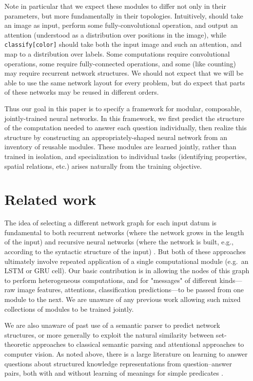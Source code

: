 \documentclass[10pt,twocolumn,letterpaper]{article}
\begin{document}
Note in particular that we expect these modules to differ not only in their
parameters, but more fundamentally in their topologies. Intuitively, 
should take an image as input, perform some fully-convolutional operation, and
output an attention (understood as a distribution over positions in the image),
while {\small\tt classify[color]} should take both the input image and such an attention, and map to a
distribution over labels. Some computations require convolutional operations, some require fully-connected operations, and some (like counting) may require recurrent network structures. We should not expect that we will be able to use the same network layout for every problem, but do expect that parts of these networks may be reused in different orders.

Thus our goal in this paper is to specify a framework for modular, composable, jointly-trained neural networks. In this framework, we first predict the structure of the computation needed to answer each question individually, then realize this structure by constructing an appropriately-shaped neural network from an inventory of reusable modules. These modules are learned jointly, rather than trained in isolation, and specialization to individual tasks (identifying properties, spatial relations, etc.) arises naturally from the training objective.

\section{Related work}

The idea of selecting a different network graph for each input datum is fundamental to both recurrent networks (where the network grows in the length of the input) \cite{Elman90RNN} and recursive neural networks (where the network is built, e.g., according to the syntactic structure of the input) \cite{Socher13CVG}. But both of these approaches ultimately involve repeated application of a single computational module (e.g.\ an LSTM or GRU cell). Our basic contribution is in allowing the nodes of this graph to perform heterogeneous computations, and for "messages" of different kinds---raw image features, attentions, classification predictions---to be passed from one module to the next. We are unaware of any previous work allowing such mixed collections of modules to be trained jointly. 

We are also unaware of past use of a semantic parser to predict network structures, or more generally to exploit the natural similarity between set-theoretic approaches to classical semantic parsing and attentional approaches to computer vision. As noted above, there is a large literature on learning to answer questions about structured knowledge representations from question--answer pairs, both with and without learning of meanings for simple predicates \cite{Liang13DCS,Krish2013Grounded}.
\end{document}
